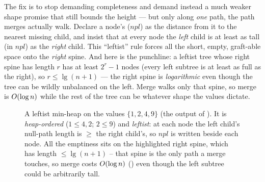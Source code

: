 The fix is to stop demanding completeness and demand instead a much weaker shape promise that still bounds
the height --- but only along \emph{one} path, the path merges actually walk. Declare a node's
 ($\mathit{npl}$) as the distance from it to the nearest missing child, and insist
that at every node the \emph{left} child is at least as tall (in $\mathit{npl}$) as the \emph{right} child.
This ``leftist'' rule forces all the short, empty, graft-able space onto the \emph{right} spine. And here is
the punchline: a leftist tree whose right spine has length $r$ has at least $2^{r}-1$ nodes (every left
subtree is at least as full as the right), so $r \le \lg(n+1)$ --- the right spine is \emph{logarithmic}
even though the tree can be wildly unbalanced on the left. Merge walks only that spine, so merge is
$O(\log n)$ while the rest of the tree can be whatever shape the values dictate.

\begin{figure}[H]
\centering
{}
\caption{A leftist min-heap on the values $\{1,2,4,9\}$ (the output of ). It is
\emph{heap-ordered} ($1\le4,2$; $2\le9$) and \emph{leftist}: at each node the left child's null-path length
is $\ge$ the right child's, so $\mathit{npl}$ is written beside each node. All the emptiness sits on the
highlighted right spine, which has length $\le\lg(n+1)$ -- that spine is the only path a merge touches, so
merge costs $O(\log n)$ () even though the left subtree could be arbitrarily tall.}\label{fig:c07-leftistfig}
\end{figure}

